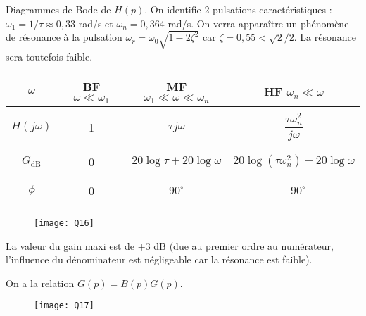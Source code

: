 \ifprof
\begin{corrige}
 Diagrammes de Bode de $H(p)$. On identifie 2 pulsations caractéristiques : $\omega_1=1/\tau\approx 0,33$ rad/s et $\omega_n=0,364$ rad/s. On verra apparaître un phénomène de résonance \`a la pulsation $\omega_r=\omega_0\sqrt{1-2\zeta^2}$ car $\zeta=0,55<\sqrt{2}/2$. La résonance sera toutefois faible.

\begin{table}[H]
\begin{center}
\begin{tabular}{|c|c|c|c|}
\hline
$\omega$ & BF $\omega \ll \omega_1$ & MF $\omega_1 \ll \omega \ll \omega_n$& HF $\omega_n \ll \omega$ \\
\hline
\hline
&&&\\
$H(j\omega)$ & 1 & $\tau j \omega$ & $\dfrac{\tau\omega_n^2}{j\omega}$\\
&&&\\
\hline
&&&\\
$G_{\text{dB}}$ & 0 & $20\log\tau+20\log\omega$ & $20\log(\tau \omega_n^2)-20\log\omega$\\
&&&\\
\hline
&&&\\
$\phi$ &0 & $90^\circ$ & $-90^\circ$ \\
&&&\\
\hline
\end{tabular}
\end{center}
\end{table}



\begin{figure}[H]
\centering
\texttt{[image: Q16]}
\end{figure}


La valeur du gain maxi est de $+3$ dB (due au premier ordre au numérateur, l’influence du dénominateur est négligeable car la résonance est faible).\\

\end{corrige}
\else
\fi



\ifprof
\begin{corrige}
On a la relation $G(p)=B(p)G(p)$. 

 \begin{figure}[H]
\centering
\texttt{[image: Q17]}
\end{figure} 


\end{corrige}
\else
\fi

